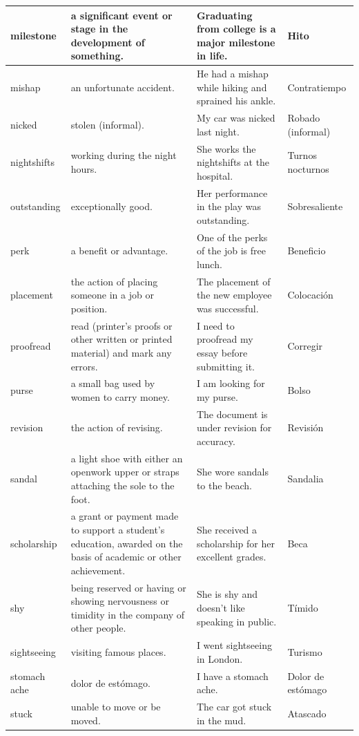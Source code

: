 \begin{longtable}{p{}p{}p{}p{}}
milestone & a significant event or stage in the development of something. & Graduating from college is a major milestone in life. & Hito\\
\hline
mishap & an unfortunate accident. & He had a mishap while hiking and sprained his ankle. & Contratiempo\\
\hline
nicked & stolen (informal). & My car was nicked last night. & Robado (informal)\\
\hline
nightshifts & working during the night hours. & She works the nightshifts at the hospital. & Turnos nocturnos \\
\hline
outstanding & exceptionally good. & Her performance in the play was outstanding. & Sobresaliente \\
\hline
perk & a benefit or advantage. & One of the perks of the job is free lunch. & Beneficio\\
\hline
placement & the action of placing someone in a job or position. & The placement of the new employee was successful. & Colocación \\
\hline
proofread & read (printer's proofs or other written or printed material) and mark any errors. & I need to proofread my essay before submitting it. & Corregir \\
\hline
purse & a small bag used by women to carry money. & I am looking for my purse. & Bolso \\
\hline
revision & the action of revising. & The document is under revision for accuracy. & Revisión \\
\hline
sandal & a light shoe with either an openwork upper or straps attaching the sole to the foot. & She wore sandals to the beach. & Sandalia \\
\hline
scholarship & a grant or payment made to support a student's education, awarded on the basis of academic or other achievement. & She received a scholarship for her excellent grades. & Beca \\
\hline
shy & being reserved or having or showing nervousness or timidity in the company of other people. & She is shy and doesn't like speaking in public. & Tímido \\
\hline
sightseeing & visiting famous places. & I went sightseeing in London. & Turismo \\
\hline
stomach ache & dolor de estómago. & I have a stomach ache. & Dolor de estómago \\
\hline
stuck & unable to move or be moved. & The car got stuck in the mud. & Atascado \\
\hline

\end{longtable}
